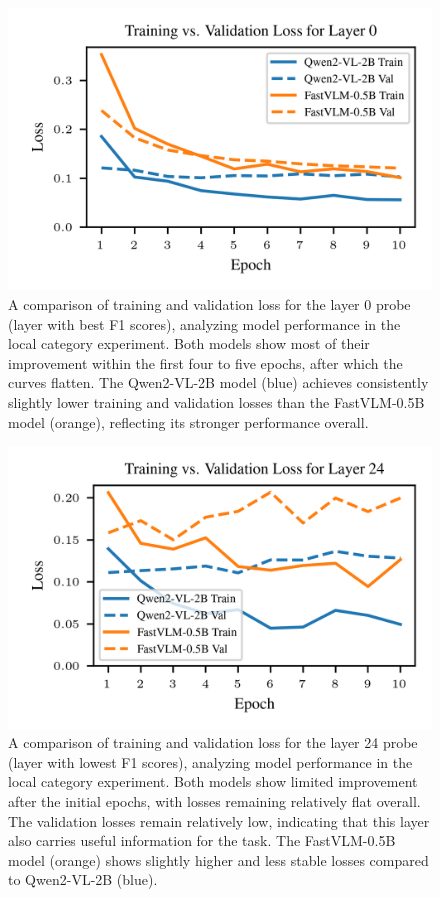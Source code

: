 \documentclass[11pt]{article}
\begin{document}
\begin{figure}[H]
    \centering
    \includegraphics[width=1\linewidth]{figures/local/_combined_exp2/combined_training_progress_layer_0.png}
    \caption{A comparison of training and validation loss for the layer 0 probe (layer with best F1 scores), analyzing model performance in the local category experiment. Both models show most of their improvement within the first four to five epochs, after which the curves flatten. The Qwen2-VL-2B model (blue) achieves consistently slightly lower training and validation losses than the FastVLM-0.5B model (orange), reflecting its stronger performance overall.}
\end{figure}

\begin{figure}[H]
    \centering
    \includegraphics[width=1\linewidth]{figures/local/_combined_exp2/combined_training_progress_layer_24.png}
    \caption{A comparison of training and validation loss for the layer 24 probe (layer with lowest F1 scores), analyzing model performance in the local category experiment. Both models show limited improvement after the initial epochs, with losses remaining relatively flat overall. The validation losses remain relatively low, indicating that this layer also carries useful information for the task. The FastVLM-0.5B model (orange) shows slightly higher and less stable losses compared to Qwen2-VL-2B (blue).}
\end{figure}
\end{document}
